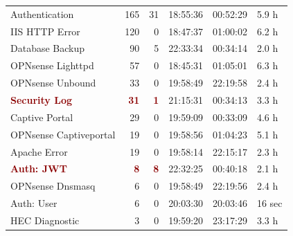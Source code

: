 \begin{table}[hbtp]
\begin{tabular}{|l|r|r|l|l|l|}
Authentication & 165 & 31 & 18:55:36 & 00:52:29 & 5.9 h \\
IIS HTTP Error & 120 & 0 & 18:47:37 & 01:00:02 & 6.2 h \\
Database Backup & 90 & 5 & 22:33:34 & 00:34:14 & 2.0 h \\
OPNsense Lighttpd & 57 & 0 & 18:45:31 & 01:05:01 & 6.3 h \\
OPNsense Unbound & 33 & 0 & 19:58:49 & 22:19:58 & 2.4 h \\
\textcolor{darkred}{\textbf{Security Log}} & \textcolor{darkred}{\textbf{31}} & \textcolor{darkred}{\textbf{1}} & 21:15:31 & 00:34:13 & 3.3 h \\
Captive Portal & 29 & 0 & 19:59:09 & 00:33:09 & 4.6 h \\
OPNsense Captiveportal & 19 & 0 & 19:58:56 & 01:04:23 & 5.1 h \\
Apache Error & 19 & 0 & 19:58:14 & 22:15:17 & 2.3 h \\
\textcolor{darkred}{\textbf{Auth: JWT}} & \textcolor{darkred}{\textbf{8}} & \textcolor{darkred}{\textbf{8}} & 22:32:25 & 00:40:18 & 2.1 h \\
OPNsense Dnsmasq & 6 & 0 & 19:58:49 & 22:19:56 & 2.4 h \\
Auth: User & 6 & 0 & 20:03:30 & 20:03:46 & 16 sec \\
HEC Diagnostic & 3 & 0 & 19:59:20 & 23:17:29 & 3.3 h \\
\hline
\end{tabular}
\end{table}

